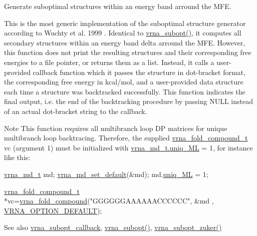 Generate suboptimal structures within an energy band arround the M\+FE. 

This is the most generic implementation of the suboptimal structure generator according to Wuchty et al. 1999 \cite{wuchty:1999}. Identical to \mbox{\hyperlink{group__subopt__wuchty_ga0f11d738fb8c8b1885a90c11c8931ff6}{vrna\+\_\+subopt()}}, it computes all secondary structures within an energy band {\ttfamily delta} arround the M\+FE. However, this function does not print the resulting structures and their corresponding free energies to a file pointer, or returns them as a list. Instead, it calls a user-\/provided callback function which it passes the structure in dot-\/bracket format, the corresponding free energy in kcal/mol, and a user-\/provided data structure each time a structure was backtracked successfully. This function indicates the final output, i.\+e. the end of the backtracking procedure by passing N\+U\+LL instead of an actual dot-\/bracket string to the callback.

\begin{DoxyNote}{Note}
This function requires all multibranch loop DP matrices for unique multibranch loop backtracing. Therefore, the supplied \mbox{\hyperlink{group__fold__compound_ga1b0cef17fd40466cef5968eaeeff6166}{vrna\+\_\+fold\+\_\+compound\+\_\+t}} {\ttfamily vc} (argument 1) must be initialized with \mbox{\hyperlink{group__model__details_ade065b814a4e2e72ead93ab502613ed2}{vrna\+\_\+md\+\_\+t.\+uniq\+\_\+\+ML}} = 1, for instance like this\+: 
\begin{DoxyCode}
\mbox{\hyperlink{group__model__details_structvrna__md__s}{vrna\_md\_t}} md;
\mbox{\hyperlink{group__model__details_ga8ac6ff84936282436f822644bf841f66}{vrna\_md\_set\_default}}(&md);
md.\mbox{\hyperlink{group__model__details_ade065b814a4e2e72ead93ab502613ed2}{uniq\_ML}} = 1;

\mbox{\hyperlink{group__fold__compound_structvrna__fc__s}{vrna\_fold\_compound\_t}} *vc=\mbox{\hyperlink{group__fold__compound_ga6601d994ba32b11511b36f68b08403be}{vrna\_fold\_compound}}(\textcolor{stringliteral}{"GGGGGGAAAAAACCCCCC"}, &md
      , \mbox{\hyperlink{group__fold__compound_gacea5b7ee6181c485f36e2afa0e9089e4}{VRNA\_OPTION\_DEFAULT}});
\end{DoxyCode}

\end{DoxyNote}
\begin{DoxySeeAlso}{See also}
\mbox{\hyperlink{group__subopt__wuchty_gaa0270c66d04f59e750401695b8282e04}{vrna\+\_\+subopt\+\_\+callback}}, \mbox{\hyperlink{group__subopt__wuchty_ga0f11d738fb8c8b1885a90c11c8931ff6}{vrna\+\_\+subopt()}}, \mbox{\hyperlink{group__subopt__zuker_gababde9d210eb433854f1e71da7815fbb}{vrna\+\_\+subopt\+\_\+zuker()}} 
\end{DoxySeeAlso}

